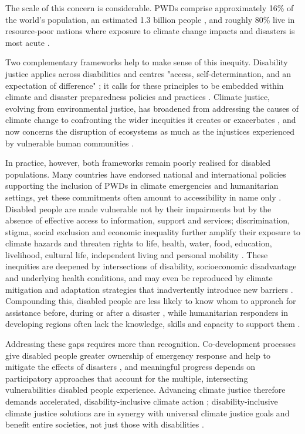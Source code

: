 \documentclass[12pt,a4paper]{report}
\begin{document}
The scale of this concern is considerable. PWDs comprise approximately 16\% of the world's population, an estimated 1.3 billion people \cite{WHO_Global_Report_Health_Equity_Disabilities_2022}, and roughly 80\% live in resource-poor nations where exposure to climate change impacts and disasters is most acute \cite{world2015global}.

Two complementary frameworks help to make sense of this inequity. Disability justice applies across disabilities and centres "access, self-determination, and an expectation of difference" \cite{ortiz2012disability}; it calls for these principles to be embedded within climate and disaster preparedness policies and practices \cite{engelman2022global}. Climate justice, evolving from environmental justice, has broadened from addressing the causes of climate change to confronting the wider inequities it creates or exacerbates \cite{anguelovski2011spatial}  \cite{King2022}, and now concerns the disruption of ecosystems as much as the injustices experienced by vulnerable human communities \cite{schlosberg2014environmental}.

In practice, however, both frameworks remain poorly realised for disabled populations. Many countries have endorsed national and international policies supporting the inclusion of PWDs in climate emergencies and humanitarian settings, yet these commitments often amount to accessibility in name only \cite{engelman2022global}. Disabled people are made vulnerable not by their impairments but by the absence of effective access to information, support and services; discrimination, stigma, social exclusion and economic inequality further amplify their exposure to climate hazards and threaten rights to life, health, water, food, education, livelihood, cultural life, independent living and personal mobility \cite{stein2022disability}. These inequities are deepened by intersections of disability, socioeconomic disadvantage and underlying health conditions, and may even be reproduced by climate mitigation and adaptation strategies that inadvertently introduce new barriers \cite{globaldisabilitysummit2025}. Compounding this, disabled people are less likely to know whom to approach for assistance before, during or after a disaster \cite{palmercase}, while humanitarian responders in developing regions often lack the knowledge, skills and capacity to support them \cite{gartrell2020cambodia}.

Addressing these gaps requires more than recognition. Co-development processes give disabled people greater ownership of emergency response and help to mitigate the effects of disasters \cite{gaskin2017factors}, and meaningful progress depends on participatory approaches that account for the multiple, intersecting vulnerabilities disabled people experience. Advancing climate justice therefore demands accelerated, disability-inclusive climate action \cite{stein2024advancing}; disability-inclusive climate justice solutions are in synergy with universal climate justice goals and benefit entire societies, not just those with disabilities \cite{stein2022disability}.
\end{document}
